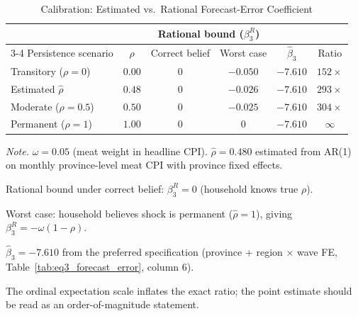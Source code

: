 \begin{table}[!htbp]
\centering
\caption{Calibration: Estimated vs.\ Rational Forecast-Error Coefficient}
\label{tab:calibration_benchmark}
\begin{threeparttable}
\begin{tabular}{lccccc}
\toprule
& & \multicolumn{2}{c}{Rational bound ($\beta_3^R$)} & & \\
\cmidrule(lr){3-4}
Persistence scenario & $\rho$ & Correct belief & Worst case & $\hat{\beta}_3$ & Ratio \\
\midrule
Transitory ($\rho = 0$) & $0.00$ & $0$ & $-0.050$ & $-7.610$ & $152\times$ \\
Estimated $\hat{\rho}$ & $0.48$ & $0$ & $-0.026$ & $-7.610$ & $293\times$ \\
Moderate ($\rho = 0.5$) & $0.50$ & $0$ & $-0.025$ & $-7.610$ & $304\times$ \\
Permanent ($\rho = 1$) & $1.00$ & $0$ & $0$ & $-7.610$ & $\infty$ \\
\bottomrule
\end{tabular}
\begin{tablenotes}[flushleft]
\footnotesize
\item \textit{Note.} $\omega = 0.05$ (meat weight in headline CPI). $\hat{\rho} = 0.480$ estimated from AR(1) on monthly province-level meat CPI with province fixed effects.
\item Rational bound under correct belief: $\beta_3^R = 0$ (household knows true $\rho$).
\item Worst case: household believes shock is permanent ($\hat{\rho} = 1$), giving $\beta_3^R = -\omega(1 - \rho)$.
\item $\hat{\beta}_3 = -7.610$ from the preferred specification (province + region $\times$ wave FE, Table~\ref{tab:eq3_forecast_error}, column 6).
\item The ordinal expectation scale inflates the exact ratio; the point estimate should be read as an order-of-magnitude statement.
\end{tablenotes}
\end{threeparttable}
\end{table}
